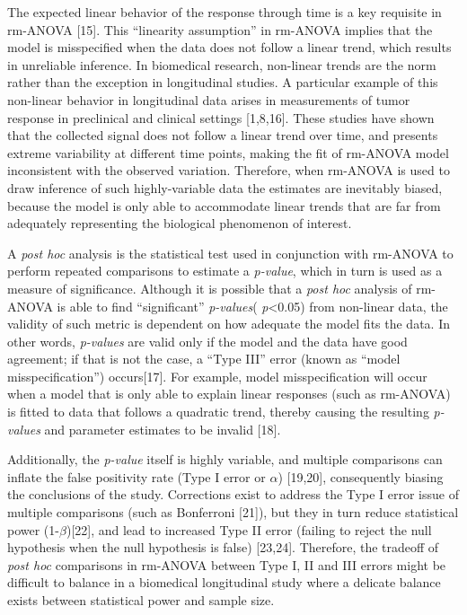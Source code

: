 \documentclass[
]{article}
\begin{document}
The expected linear behavior of the response through time is a key requisite in rm-ANOVA {[}15{]}. This ``linearity assumption'' in rm-ANOVA implies that the model is misspecified when the data does not follow a linear trend, which results in unreliable inference. In biomedical research, non-linear trends are the norm rather than the exception in longitudinal studies. A particular example of this non-linear behavior in longitudinal data arises in measurements of tumor response in preclinical and clinical settings {[}1,8,16{]}. These studies have shown that the collected signal does not follow a linear trend over time, and presents extreme variability at different time points, making the fit of rm-ANOVA model inconsistent with the observed variation. Therefore, when rm-ANOVA is used to draw inference of such highly-variable data the estimates are inevitably biased, because the model is only able to accommodate linear trends that are far from adequately representing the biological phenomenon of interest.

A \emph{post hoc} analysis is the statistical test used in conjunction with rm-ANOVA to perform repeated comparisons to estimate a \emph{p-value}, which in turn is used as a measure of significance.
Although it is possible that a \emph{post hoc} analysis of rm-ANOVA is able to find ``significant'' \emph{p-values}( \emph{p}\textless{}0.05) from non-linear data, the validity of such metric is dependent on how adequate the model fits the data. In other words, \emph{p-values} are valid only if the model and the data have good agreement; if that is not the case, a ``Type III'' error (known as ``model misspecification'') occurs{[}17{]}. For example, model misspecification will occur when a model that is only able to explain linear responses (such as rm-ANOVA) is fitted to data that follows a quadratic trend, thereby causing the resulting \emph{p-values} and parameter estimates to be invalid {[}18{]}.

Additionally, the \emph{p-value} itself is highly variable, and multiple comparisons can inflate the false positivity rate (Type I error or \(\alpha\)) {[}19,20{]}, consequently biasing the conclusions of the study. Corrections exist to address the Type I error issue of multiple comparisons (such as Bonferroni {[}21{]}), but they in turn reduce statistical power (1-\(\beta\)){[}22{]}, and lead to increased Type II error (failing to reject the null hypothesis when the null hypothesis is false) {[}23,24{]}. Therefore, the tradeoff of \emph{post hoc} comparisons in rm-ANOVA between Type I, II and III errors might be difficult to balance in a biomedical longitudinal study where a delicate balance exists between statistical power and sample size.
\end{document}

